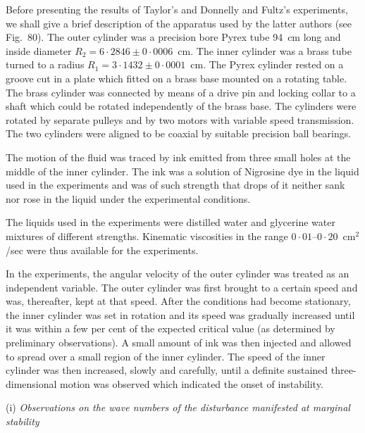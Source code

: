 Before presenting the results of Taylor's and Donnelly and Fultz's
experiments, we shall give a brief description of the apparatus used by
the latter authors (see Fig.~80).  The outer cylinder was a precision
bore Pyrex tube 94~cm long and inside diameter $R_2 = 6{\cdot}2846 \pm 0{\cdot}0006$~cm.
The inner cylinder was a brass tube turned to a radius
$R_1 = 3{\cdot}1432 \pm 0{\cdot}0001$~cm.  The Pyrex cylinder rested on a groove cut
in a plate which fitted on a brass base mounted on a rotating table.  The
brass cylinder was connected by means of a drive pin and locking collar
to a shaft which could be rotated independently of the brass base.  The
cylinders were rotated by separate pulleys and by two motors with
variable speed transmission.  The two cylinders were aligned to be coaxial
by suitable precision ball bearings.


The motion of the fluid was traced by ink emitted from three small
holes at the middle of the inner cylinder.  The ink was a solution of
Nigrosine dye in the liquid used in the experiments and was of such
strength that drops of it neither sank nor rose in the liquid under the
experimental conditions.

The liquids used in the experiments were distilled water and glycerine
water mixtures of different strengths.  Kinematic viscosities in the range
$0{\cdot}01$--$0{\cdot}20$~cm$^2$/sec were thus available for the experiments.

In the experiments, the angular velocity of the outer cylinder was
treated as an independent variable.  The outer cylinder was first brought
to a certain speed and was, thereafter, kept at that speed.  After the
conditions had become stationary, the inner cylinder was set in rotation
and its speed was gradually increased until it was within a few per cent of
the expected critical value (as determined by preliminary observations).
A small amount of ink was then injected and allowed to spread over a
small region of the inner cylinder.  The speed of the inner cylinder was
then increased, slowly and carefully, until a definite sustained three-dimensional
motion was observed which indicated the onset of instability.

\medskip
\noindent (i) \textit{Observations on the wave numbers of the disturbance manifested at
marginal stability}

